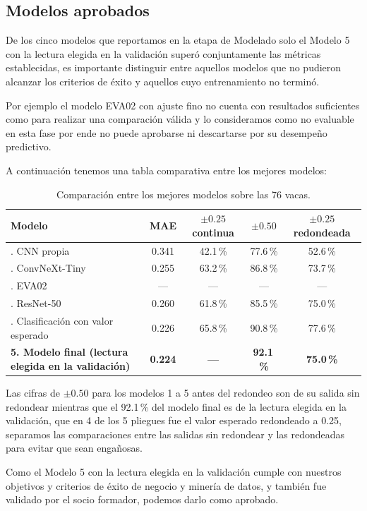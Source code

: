 \subsection{Modelos aprobados}

De los cinco modelos que reportamos en la etapa de Modelado solo el Modelo 5 con la lectura elegida en la validación superó conjuntamente las métricas establecidas, es importante distinguir entre aquellos modelos que no pudieron alcanzar los criterios de éxito y aquellos cuyo entrenamiento no terminó.

Por ejemplo el modelo EVA02 con ajuste fino no cuenta con resultados suficientes como para realizar una comparación válida y lo consideramos como no evaluable en esta fase por ende no puede aprobarse ni descartarse por su desempeño predictivo.

A continuación tenemos una tabla comparativa entre los mejores modelos:

\begin{table}[H]
  \centering
  \small
  \caption{Comparación entre los mejores modelos sobre las 76 vacas.}
  \label{tab:modelos}
  \begin{tabularx}{\textwidth}{>{\raggedright\arraybackslash}Xcccc}
    \toprule
    Modelo & MAE & $\pm0.25$ continua & $\pm0.50$ & $\pm0.25$ redondeada \\
    \midrule
    1. CNN propia & 0.341 & 42.1\,\% & 77.6\,\% & 52.6\,\% \\
    \addlinespace
    2. ConvNeXt-Tiny & 0.255 & 63.2\,\% & 86.8\,\% & 73.7\,\% \\
    \addlinespace
    3. EVA02 & --- & --- & --- & --- \\
    \addlinespace
    4. ResNet-50 & 0.260 & 61.8\,\% & 85.5\,\% & 75.0\,\% \\
    \addlinespace
    5. Clasificación con valor esperado & 0.226 & 65.8\,\% & 90.8\,\% & 77.6\,\% \\
    \addlinespace
    \textbf{5. Modelo final (lectura elegida en la validación)} & \textbf{0.224} & \textbf{---} & \textbf{92.1\,\%} & \textbf{75.0\,\%} \\
    \bottomrule
  \end{tabularx}
\end{table}

Las cifras de $\pm0.50$ para los modelos 1 a 5 antes del redondeo son de su salida sin redondear mientras que el 92.1\,\% del modelo final es de la lectura elegida en la validación, que en 4 de los 5 pliegues fue el valor esperado redondeado a 0.25, separamos las comparaciones entre las salidas sin redondear y las redondeadas para evitar que sean engañosas.

Como el Modelo 5 con la lectura elegida en la validación cumple con nuestros objetivos y criterios de éxito de negocio y minería de datos, y también fue validado por el socio formador, podemos darlo como aprobado.
